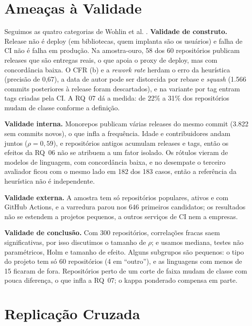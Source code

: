 \documentclass[12pt]{article}
\begin{document}
\section{Ameaças à Validade}
\label{sec:ameacas}

Seguimos as quatro categorias de Wohlin et al. \cite{wohlin2012}.
\textbf{Validade de construto.} Release não é deploy (em bibliotecas, quem
implanta são os usuários) e falha de CI não é falha em produção. Na
amostra-ouro, 58 dos 60 repositórios publicam releases que são entregas reais,
o que apoia o proxy de deploy, mas com concordância baixa. O CFR (b) e a
\emph{rework rate} herdam o erro da heurística (precisão de 0,67), a data de
autor pode ser distorcida por rebase e \emph{squash} (1.566 commits posteriores
à release foram descartados), e na variante por tag entram tags criadas pela CI.
A RQ~07 dá a medida: de 22\% a 31\% dos repositórios mudam de classe conforme a
definição.

\textbf{Validade interna.} Monorepos publicam várias releases do mesmo commit
(3.822 sem commits novos), o que infla a frequência. Idade e contribuidores
andam juntos ($\rho = 0{,}59$), e repositórios antigos acumulam releases e tags,
então os efeitos da RQ~06 não se atribuem a um fator isolado. Os rótulos vieram
de modelos de linguagem, com concordância baixa, e no desempate o terceiro
avaliador ficou com o mesmo lado em 182 dos 183 casos, então a referência da
heurística não é independente.

\textbf{Validade externa.} A amostra tem só repositórios populares, ativos e com
GitHub Actions, e a varredura parou nos 646 primeiros candidatos; os resultados
não se estendem a projetos pequenos, a outros serviços de CI nem a empresas.

\textbf{Validade de conclusão.} Com 300 repositórios, correlações fracas saem
significativas, por isso discutimos o tamanho de $\rho$; e usamos mediana,
testes não paramétricos, Holm e tamanho de efeito. Alguns subgrupos são
pequenos: o tipo do projeto tem só 60 repositórios (4 em ``outro''), e as
linguagens com menos de 15 ficaram de fora. Repositórios perto de um corte de
faixa mudam de classe com pouca diferença, o que infla a RQ~07; o kappa
ponderado compensa em parte.

\section{Replicação Cruzada}
\label{sec:replicacao}
\end{document}
